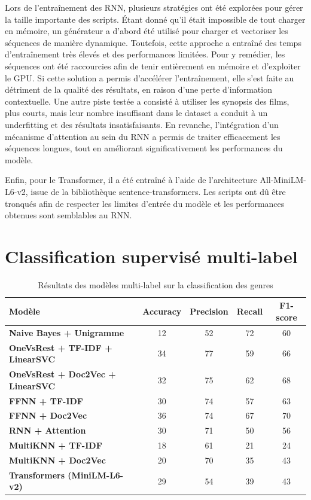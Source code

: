 \documentclass[12pt]{report}
\begin{document}
Lors de l’entraînement des RNN, plusieurs stratégies ont été explorées pour gérer la taille importante des scripts. Étant donné qu’il était impossible de tout charger en mémoire, un générateur a d’abord été utilisé pour charger et vectoriser les séquences de manière dynamique. Toutefois, cette approche a entraîné des temps d’entraînement très élevés et des performances limitées. Pour y remédier, les séquences ont été raccourcies afin de tenir entièrement en mémoire et d’exploiter le GPU. Si cette solution a permis d’accélérer l'entraînement, elle s’est faite au détriment de la qualité des résultats, en raison d’une perte d’information contextuelle. Une autre piste testée a consisté à utiliser les synopsis des films, plus courts, mais leur nombre insuffisant dans le dataset a conduit à un underfitting et des résultats insatisfaisants. En revanche, l’intégration d’un mécanisme d’attention au sein du RNN a permis de traiter efficacement les séquences longues, tout en améliorant significativement les performances du modèle. 

Enfin, pour le Transformer, il a été entraîné à l’aide de l’architecture All-MiniLM-L6-v2, issue de la bibliothèque sentence-transformers. Les scripts ont dû être tronqués afin de respecter les limites d’entrée du modèle et les performances obtenues sont semblables au RNN. 

\section{Classification supervisé multi-label}

\begin{table}[H]
\centering
\begin{tabular}{|l|c|c|c|c|}
\hline
\textbf{Modèle} & \textbf{Accuracy} & \textbf{Precision} & \textbf{Recall} & \textbf{F1-score} \\
\hline
\textbf{Naive Bayes + Unigramme}                      & 12 & 52 & 72 & 60 \\
\textbf{OneVsRest + TF-IDF + LinearSVC }             & 34 & 77 & 59 & 66 \\
\textbf{OneVsRest + Doc2Vec + LinearSVC}             & 32 & 75 & 62 & 68 \\
\textbf{FFNN + TF-IDF }                                & 30 & 74 & 57 & 63 \\
\textbf{FFNN + Doc2Vec}                                & 36 & 74 & 67 & 70 \\
\textbf{RNN + Attention}                              & 30 & 71 & 50 & 56 \\
\textbf{MultiKNN + TF-IDF}                            & 18 & 61 & 21 & 24 \\
\textbf{MultiKNN + Doc2Vec }                          & 20 & 70 & 35 & 43 \\
\textbf{Transformers (MiniLM-L6-v2)  }                & 29 & 54 & 39 & 43 \\
\hline
\end{tabular}
\caption{Résultats des modèles multi-label sur la classification des genres}
\label{tab:multilabel_results}
\end{table}
\end{document}
